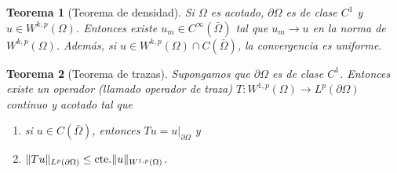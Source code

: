 \documentclass[12pt,a4paper]{book}
\DeclarePairedDelimiter\norm{\lVert}{\rVert}
\newtheorem{thm}{Teorema}[section]
\theoremstyle{definition} \newtheorem{defn}[thm]{Definición}
\theoremstyle{definition} \newtheorem{ejemplo}[thm]{Ejemplo}
\theoremstyle{definition} \newtheorem{ejercicio}[thm]{Ejercicio}
\theoremstyle{remark} \newtheorem*{obs}{Observación}
\newcommand{\cte}{\mathrm{cte.}}
\begin{document}
  \begin{thm}[Teorema de densidad]
    Si $\Omega$ es acotado, $\partial \Omega$ es de clase $C^1$ y $u\in W^{k,p}(\Omega)$. Entonces existe $u_m \in C^{\infty}(\bar\Omega)$ tal que $u_m \rightarrow u$ en la norma de $W^{k,p}(\Omega)$. Además, si $u\in W^{k,p}(\Omega) \cap C(\bar\Omega)$, la convergencia es uniforme.
  \end{thm}

  \begin{thm}[Teorema de trazas]
    Supongamos que $\partial \Omega$ es de clase $C^1$. Entonces existe un operador (llamado \emph{operador de traza}) $T:W^{1,p}(\Omega)\rightarrow L^p(\partial \Omega)$ continuo y acotado tal que
    \begin{enumerate}
      \item si $u\in C(\bar\Omega)$, entonces $Tu=u|_{\partial \Omega}$ y
      \item $\norm{Tu}_{L^p(\partial\Omega)} \leq \cte \norm{u}_{W^{1,p}(\Omega)}$.
    \end{enumerate}
  \end{thm}
\end{document}
